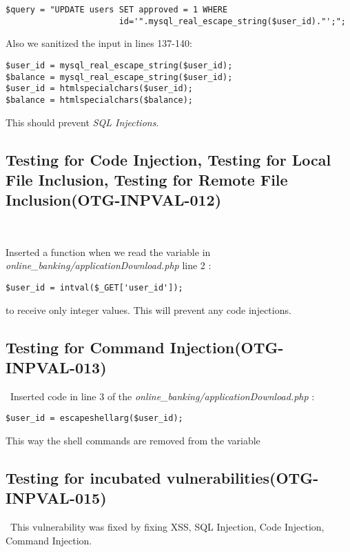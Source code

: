 \documentclass[headsepline,footsepline,footinclude=false,oneside,fontsize=11pt,paper=a4,listof=totoc,bibliography=totoc]{scrbook} %
\begin{document}
\begin{lstlisting} 
$query = "UPDATE users SET approved = 1 WHERE 
                       id='".mysql_real_escape_string($user_id)."';";
\end{lstlisting}
Also we sanitized the input in lines 137-140:

\begin{lstlisting}
$user_id = mysql_real_escape_string($user_id); 
$balance = mysql_real_escape_string($user_id);
$user_id = htmlspecialchars($user_id);
$balance = htmlspecialchars($balance);
\end{lstlisting}

This should prevent \textit{SQL Injections}.\\

\pagebreak
\subsection{Testing for Code Injection, Testing for Local File Inclusion, Testing for Remote File Inclusion(OTG-INPVAL-012)}\


Inserted a function when we read the variable in \textit{online\_banking/applicationDownload.php} line 2 :  

\begin{lstlisting} 
$user_id = intval($_GET['user_id']);
\end{lstlisting} 
to receive only integer values.
This will prevent any code injections.\\

\subsection{Testing for Command Injection(OTG-INPVAL-013)}\
Inserted code in line 3 of the \textit{online\_banking/applicationDownload.php} : 

\begin{lstlisting} 
$user_id = escapeshellarg($user_id);
\end{lstlisting}

 This way the shell commands are removed from the variable\\
 

\subsection{Testing for incubated vulnerabilities(OTG-INPVAL-015)}\
This vulnerability was fixed by fixing XSS, SQL Injection, Code Injection, Command Injection.
 
\end{document}
